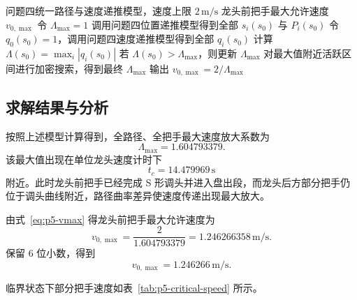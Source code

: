 \begin{algorithm}[H]
    \caption{问题五龙头最大速度求解算法}
    \label{alg:p5-vmax}
    \begin{algorithmic}[1]
        \Require 问题四统一路径与速度递推模型，速度上限 $2\,\mathrm{m/s}$
        \Ensure 龙头前把手最大允许速度 $v_{0,\max}$
        \State 令 $\Lambda_{\max}=1$
            \State 调用问题四位置递推模型得到全部 $s_i(s_0)$ 与 $P_i(s_0)$
            \State 令 $q_0(s_0)=1$，调用问题四速度递推模型得到全部 $q_i(s_0)$
            \State 计算 $\Lambda(s_0)=\max_i |q_i(s_0)|$
            \State 若 $\Lambda(s_0)>\Lambda_{\max}$，则更新 $\Lambda_{\max}$
        \EndFor
        \State 对最大值附近活跃区间进行加密搜索，得到最终 $\Lambda_{\max}$
        \State 输出 $v_{0,\max}=2/\Lambda_{\max}$
    \end{algorithmic}
\end{algorithm}

\subsection{求解结果与分析}

按照上述模型计算得到，全路径、全把手最大速度放大系数为
\begin{equation}
    \Lambda_{\max}=1.604793379.
    \label{eq:p5-lambda-result}
\end{equation}
该最大值出现在单位龙头速度计时下
\begin{equation}
    t_c=14.479969\,\mathrm{s}
    \label{eq:p5-critical-time}
\end{equation}
附近。此时龙头前把手已经完成 S 形调头并进入盘出段，而龙头后方部分把手仍位于调头曲线附近，路径曲率差异使速度传递出现最大放大。

由式~\eqref{eq:p5-vmax} 得龙头前把手最大允许速度为
\begin{equation}
    v_{0,\max}
    =\frac{2}{1.604793379}
    =1.246266358\,\mathrm{m/s}.
    \label{eq:p5-vmax-result}
\end{equation}
保留 $6$ 位小数，得到
\begin{equation}
    v_{0,\max}=1.246266\,\mathrm{m/s}.
    \label{eq:p5-vmax-six}
\end{equation}

临界状态下部分把手速度如表~\ref{tab:p5-critical-speed} 所示。

